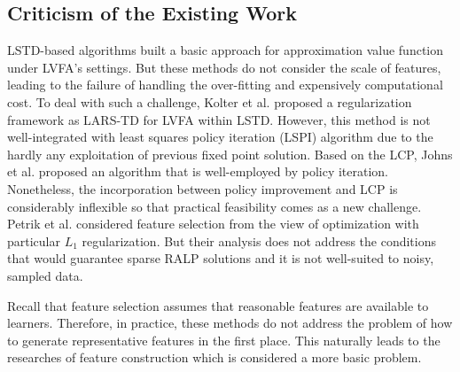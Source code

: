 \documentclass[onecolumn, conference]{IEEEtran}
\begin{document}
\subsection{Criticism of the Existing Work}\label{subsec:criticism}
LSTD-based algorithms \cite{Bradtke2004LinearLA, Sutton2005LearningTP, Geramifard2006IncrementalLT} built a basic approach for approximation value function under LVFA's settings. But these methods do not consider the scale of features, leading to the failure of handling the over-fitting and expensively computational cost. To deal with such a challenge, Kolter et al.\cite{Kolter2009RegularizationAF} proposed a regularization framework as LARS-TD for LVFA within LSTD. However, this method is not well-integrated with least squares policy iteration (LSPI) \cite{Lagoudakis2003LeastSquaresPI} algorithm due to the  hardly any exploitation of previous fixed point solution. Based on the LCP, Johns et al.\cite{Johns2010LinearCF} proposed an algorithm that is well-employed by policy iteration. Nonetheless, the incorporation between policy improvement and LCP is considerably inflexible so that practical feasibility comes as a new challenge. Petrik et al.\cite{Petrik2010FeatureSU} considered feature selection from the view of optimization with particular $L_1$ regularization. But their analysis does not address the conditions that would guarantee sparse RALP solutions and it is not well-suited to noisy, sampled data.
    
Recall that feature selection assumes that reasonable features are available to learners. Therefore, in practice, these methods \cite{Bradtke2004LinearLA, Sutton2005LearningTP, Geramifard2006IncrementalLT, Kolter2009RegularizationAF, Johns2010LinearCF, Petrik2010FeatureSU} do not address the problem of how to generate representative features in the first place. This naturally leads to the researches of feature construction which is considered a more basic problem. 
\end{document}
